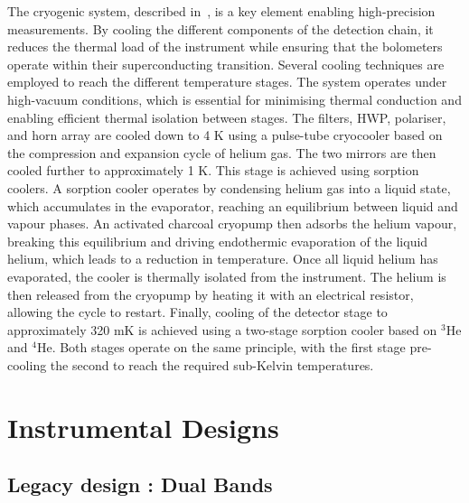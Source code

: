 \documentclass[../../thesis.tex]{subfiles}
\begin{document}
The cryogenic system, described in~\cite{QUBICV}, is a key element enabling high-precision measurements. By cooling the different components of the detection chain, it reduces the thermal load of the instrument while ensuring that the bolometers operate within their superconducting transition. Several cooling techniques are employed to reach the different temperature stages. The system operates under high-vacuum conditions, which is essential for minimising thermal conduction and enabling efficient thermal isolation between stages.
The filters, HWP, polariser, and horn array are cooled down to 4 K using a pulse-tube cryocooler based on the compression and expansion cycle of helium gas. The two mirrors are then cooled further to approximately 1 K. This stage is achieved using sorption coolers. A sorption cooler operates by condensing helium gas into a liquid state, which accumulates in the evaporator, reaching an equilibrium between liquid and vapour phases. An activated charcoal cryopump then adsorbs the helium vapour, breaking this equilibrium and driving endothermic evaporation of the liquid helium, which leads to a reduction in temperature. Once all liquid helium has evaporated, the cooler is thermally isolated from the instrument. The helium is then released from the cryopump by heating it with an electrical resistor, allowing the cycle to restart.
Finally, cooling of the detector stage to approximately 320 mK is achieved using a two-stage sorption cooler based on $^3$He and $^4$He. Both stages operate on the same principle, with the first stage pre-cooling the second to reach the required sub-Kelvin temperatures.

\section{Instrumental Designs}

\subsection{Legacy design : Dual Bands} \label{sub:DB_design}
\end{document}
